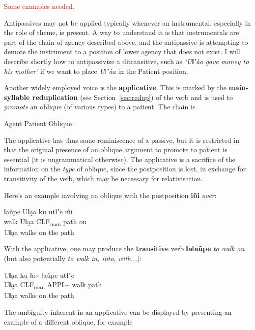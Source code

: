 \documentclass[11pt,a5paper]{book}
\newcommand{\qcn}[1]{\textcolor{AccentText}{\large\textbf{#1}}}
\newcommand{\transl}[2]{\qcn{#1} \emph{#2}}
\newcommand{\grammsc}[1]{\textsc{#1}}
\newcommand{\CLF}[1]{\grammsc{CLF}\textsubscript{#1}}
\newcommand{\cmnt}[1]{\textcolor{red}{#1}}
\begin{document}
\cmnt{Some examples needed.}

Antipassives may not be applied typically whenever an instrumental, especially in the role of theme, is present. A way to understand it is that instrumentals are part of the chain of agency described above, and the antipassive is attempting to demote the instrument to a position of lower agency that does not exist. I will describe shortly how to antipassivize a ditransitive, such as \emph{`Uǁʼàa gave money to his mother'} if we want to place \emph{Uǁʼàa} in the Patient position.

Another widely employed voice is the \textbf{applicative}. This is marked by the \textbf{main-syllable reduplication} (see Section~\ref{sec:redup}) of the verb and is used to \emph{promote} an oblique (of various types) to a patient. The chain is

\begin{center}
	Agent \textleftarrow Patient \textleftarrow Oblique
\end{center}

The applicative has thus some reminiscence of a passive, but it is restricted in that the original presence of an oblique argument to promote to patient is essential (it is ungrammatical otherwise). The applicative is a sacrifice of the information on the \emph{type} of oblique, since the postposition is lost, in exchange for transitivity of the verb, which may be necessary for relativisation.

Here's an example involving an oblique with the postposition \transl{iñi}{over}:

\begin{exe}
\ex
\gll ǁaũpe Uǁa̰a ku utłʼe iñi\\
walk Uǁa̰a \CLF{man} path on\\
\glt Uǁa̰a walks on the path
\end{exe}

With the applicative, one may produce the \textbf{transitive} verb \transl{ǁaǁaũpe}{to walk on} (but also potentially \transl{}{to walk in, into, with...}):

\begin{exe}
\ex
\gll Uǁa̰a ku ǁa\textasciitilde{} ǁaũpe utłʼe \\
Uǁa̰a \CLF{man} APPL\textasciitilde{} walk path \\
\glt Uǁa̰a walks on the path
\end{exe}

The ambiguity inherent in an applicative can be displayed by presenting an example of a different oblique, for example
\end{document}
